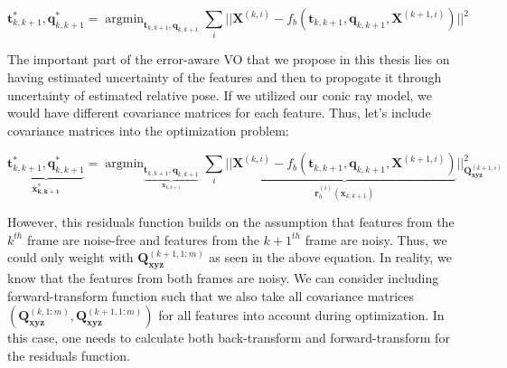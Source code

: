 \documentclass[a4paper]{report}
\numberwithin{figure}{section}
\newcommand{\argmin}{\mathop{\mathrm{argmin}}}
\begin{document}
\begin{equation} \mathbf{t}_{k,k+1}^*, \mathbf{q}_{k,k+1}^* =
\argmin_{\mathbf{t}_{k,k+1}, \mathbf{q}_{k,k+1}} \sum_i|| \mathbf{X}^{(k,i)} -
f_b(\mathbf{t}_{k,k+1}, \mathbf{q}_{k,k+1}, \mathbf{X}^{(k+1,i)})||^2
\end{equation}

The important part of the error-aware VO that we propose in this thesis lies on
having estimated uncertainty of the features and then to propogate it through
uncertainty of estimated relative pose.  If we utilized our conic ray model, we
would have different covariance matrices for each feature.  Thus, let's include
covariance matrices into the optimization problem:

\begin{equation} \underbrace{\mathbf{t}_{k,k+1}^*,
\mathbf{q}_{k,k+1}^*}_{\mathbf{x^*_{k,k+1}}} =
\argmin_{\underbrace{\mathbf{t}_{k,k+1},
\mathbf{q}_{k,k+1}}_{\mathbf{x}_{k,k+1}}} \sum_i||
\underbrace{\mathbf{X}^{(k,i)} - f_b(\mathbf{t}_{k,k+1}, \mathbf{q}_{k,k+1},
\mathbf{X}^{(k+1,i)})} _{\mathbf{r}^{(i)}_{b}(\mathbf{x}_{k,k+1})}
||^2_{\mathbf{Q}^{(k+1,i)}_{\mathbf{xyz}}} \end{equation}


However, this residuals function builds on the assumption that features from
the $k^{th}$ frame are noise-free and features from the $k+1^{th}$ frame are
noisy.  Thus, we could only weight with $\mathbf{Q}^{(k+1,1:m)}_{\mathbf{xyz}}$
as seen in the above equation.  In reality, we know that the features from both
frames are noisy. We can consider including forward-transform function such
that we also take all covariance matrices
$(\mathbf{Q}^{(k,1:m)}_{\mathbf{xyz}}, \mathbf{Q}^{(k+1,1:m)}_{\mathbf{xyz}})$
for all features into account during optimization.  In this case, one needs to
calculate both back-transform and forward-transform for the residuals function.
\end{document}
